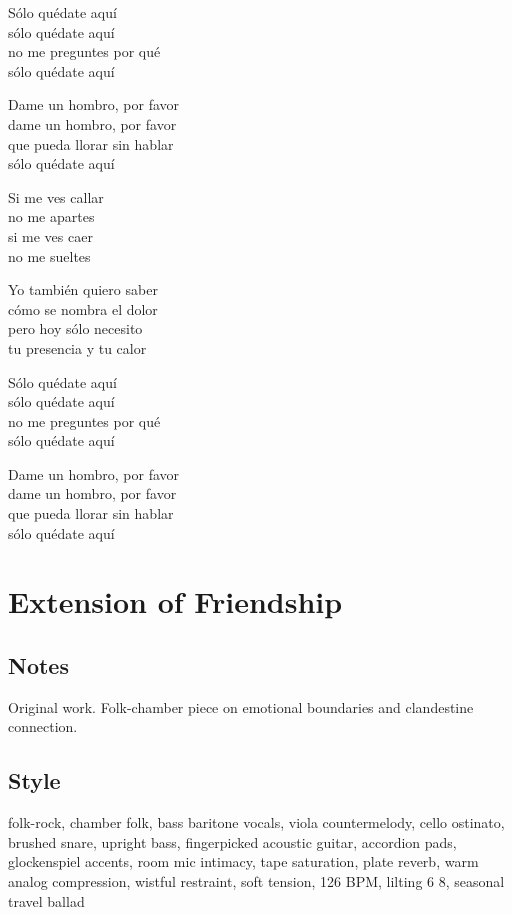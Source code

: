 \begin{lyrics}
Sólo quédate aquí\\
sólo quédate aquí\\
no me preguntes por qué\\
sólo quédate aquí

Dame un hombro, por favor\\
dame un hombro, por favor\\
que pueda llorar sin hablar\\
sólo quédate aquí

Si me ves callar\\
no me apartes\\
si me ves caer\\
no me sueltes

Yo también quiero saber\\
cómo se nombra el dolor\\
pero hoy sólo necesito\\
tu presencia y tu calor

Sólo quédate aquí\\
sólo quédate aquí\\
no me preguntes por qué\\
sólo quédate aquí

Dame un hombro, por favor\\
dame un hombro, por favor\\
que pueda llorar sin hablar\\
sólo quédate aquí
\end{lyrics}

\section{Extension of Friendship}

\subsection{Notes}
Original work.
Folk-chamber piece on emotional boundaries and clandestine connection.

\subsection{Style}
folk-rock, chamber folk, bass baritone vocals, viola countermelody, cello ostinato, brushed snare, upright bass, fingerpicked acoustic guitar, accordion pads, glockenspiel accents, room mic intimacy, tape saturation, plate reverb, warm analog compression, wistful restraint, soft tension, 126 BPM, lilting 6 8, seasonal travel ballad

